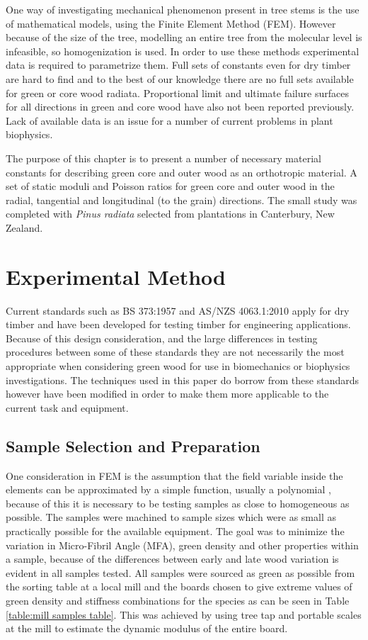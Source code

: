 \documentclass[10pt]{article}
\begin{document}
One way of investigating mechanical phenomenon present in tree stems is the use of mathematical models, using the Finite Element Method (FEM). However because of the size of the tree, modelling an entire tree from the molecular level is infeasible, so homogenization is used. In order to use these methods experimental data is required to parametrize them. Full sets of constants even for dry timber are hard to find and to the best of our knowledge there are no full sets available for green or core wood radiata. Proportional limit and ultimate failure surfaces for all directions in green and core wood have also not been reported previously. Lack of available data is an issue for a number of current problems in plant biophysics.

The purpose of this chapter is to present a number of necessary material constants for describing green core and outer wood as an orthotropic material. A set of static moduli and Poisson ratios for green core and outer wood in the radial, tangential and longitudinal (to the grain) directions. The small study was completed with \textit{Pinus radiata} selected from plantations in Canterbury, New Zealand.

\section{Experimental Method}
Current standards such as BS 373:1957 \citep{bs_methods_1957} and AS/NZS 4063.1:2010 \citep{aus/nzs_characterization_2010} apply for dry timber and have been developed for testing timber for engineering applications. Because of this design consideration, and the large differences in testing procedures between some of these standards they are not necessarily the most appropriate when considering green wood for use in biomechanics or biophysics investigations. The techniques used in this paper do borrow from these standards however have been modified in order to make them more applicable to the current task and equipment.

\subsection{Sample Selection and Preparation}
One consideration in FEM is the assumption that the field variable inside the elements can be approximated by a simple function, usually a polynomial \citep{rao_finite_1999}, because of this it is necessary to be testing samples as close to homogeneous as possible. The samples were machined to sample sizes which were as small as practically possible for the available equipment. The goal was to minimize the variation in Micro-Fibril Angle (MFA), green density and other properties within a sample, because of the differences between early and late wood variation is evident in all samples tested. All samples were sourced as green as possible from the sorting table at a local mill and the  boards chosen to give extreme values of green density and stiffness combinations for the species as can be seen in Table \ref{table:mill samples table}. This was achieved by using tree tap \citep{Chauhan_methods_2013} and portable scales at the mill to estimate the dynamic modulus of the entire board.
\end{document}
